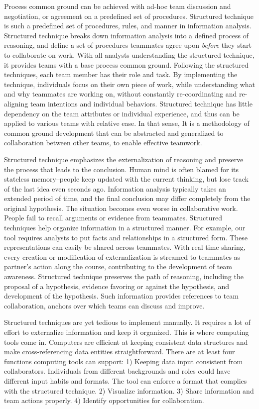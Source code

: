 Process common ground can be achieved with ad-hoc team discussion and negotiation, or agreement on a predefined set of procedures. Structured technique is such a predefined set of procedures, rules, and manner in information analysis. Structured technique breaks down information analysis into a defined process of reasoning, and define a set of procedures teammates agree upon \textit{before} they start to collaborate on work. With all analysts understanding the structured technique, it provides teams with a base process common ground. Following the structured techniques, each team member has their role and task. By implementing the technique, individuals focus on their own piece of work, while understanding what and why teammates are working on, without constantly re-coordinating and re-aligning team intentions and individual behaviors. Structured technique has little dependency on the team attributes or individual experience, and thus can be applied to various teams with relative ease. In that sense, It is a methodology of common ground development that can be abstracted and generalized to collaboration between other teams, to enable effective teamwork. 

Structured technique emphasizes the externalization of reasoning and preserve the process that leads to the conclusion. Human mind is often blamed for its stateless memory--people keep updated with the current thinking, but lose track of the last idea even seconds ago. Information analysis typically takes an extended period of time, and the final conclusion may differ completely from the original hypothesis. The situation becomes even worse in collaborative work. People fail to recall arguments or evidence from teammates. Structured techniques help organize information in a structured manner. For example, our tool requires analysts to put facts and relationships in a structured form. These representations can easily be shared across teammates. With real time sharing, every creation or modification of externalization is streamed to teammates as partner's action along the course, contributing to the development of team awareness. Structured technique preserves the path of reasoning, including the proposal of a hypothesis, evidence favoring or against the hypothesis, and development of the hypothesis. Such information provides references to team collaboration, anchors over which teams can discuss and improve.

Structured techniques are yet tedious to implement manually. It requires a lot of effort to externalize information and keep it organized. This is where computing tools come in. Computers are efficient at keeping consistent data structures and make cross-referencing data entities straightforward. There are at least four functions computing tools can support: 1) Keeping data input consistent from collaborators. Individuals from different backgrounds and roles could have different input habits and formats. The tool can enforce a format that complies with the structured technique. 2) Visualize information. 3) Share information and team actions properly. 4) Identify opportunities for collaboration.

